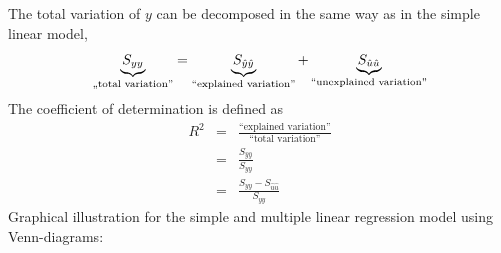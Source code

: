 \documentclass{article}
\begin{document}
The total variation of $y$ can be decomposed in the same way as in the
simple linear model,
\begin{equation*}
 \underbrace{S_{yy}}_{\text{\quotedblbase total variation\textquotedblright }}
=\underbrace{S_{\hat{y}\hat{y}}}_{\text{``explained variation''}}
+\underbrace{S_{\hat{u}\hat{u}}}_{\text{``unexplained variation''}}
\end{equation*}
The coefficient of determination is defined as
\begin{eqnarray*}
R^{2} &=&\frac{\text{``explained variation''}}{\text{``total variation''}} \\
&=&\frac{S_{\hat{y}\hat{y}}}{S_{yy}} \\
&=&\frac{S_{yy}-S_{\hat{u}\hat{u}}}{S_{yy}}
\end{eqnarray*}
Graphical illustration for the simple and multiple linear regression model using Venn-diagrams:
\end{document}

